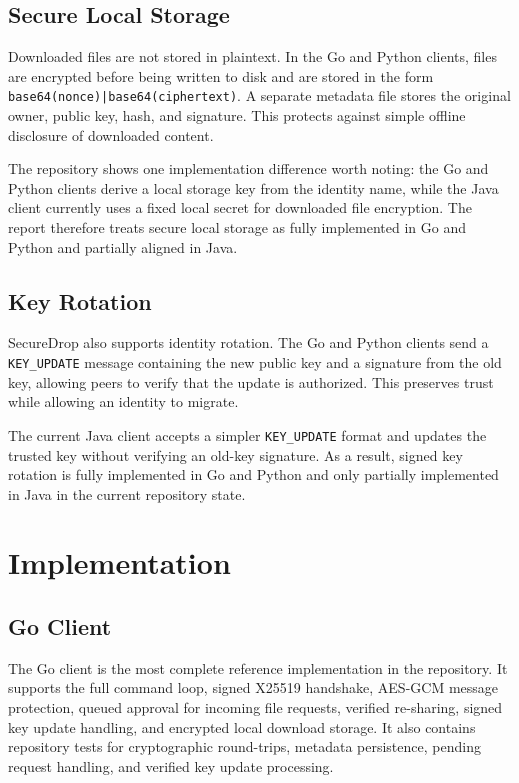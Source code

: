 \documentclass[sigconf,nonacm]{acmart}
\begin{document}
\subsection{Secure Local Storage}
Downloaded files are not stored in plaintext. In the Go and Python
clients, files are encrypted before being written to disk and are stored
in the form \texttt{base64(nonce)|base64(ciphertext)}. A separate metadata
file stores the original owner, public key, hash, and signature. This
protects against simple offline disclosure of downloaded content.

The repository shows one implementation difference worth noting: the Go
and Python clients derive a local storage key from the identity name,
while the Java client currently uses a fixed local secret for downloaded
file encryption. The report therefore treats secure local storage as fully
implemented in Go and Python and partially aligned in Java.

\subsection{Key Rotation}
SecureDrop also supports identity rotation. The Go and Python clients send
a \texttt{KEY\_UPDATE} message containing the new public key and a
signature from the old key, allowing peers to verify that the update is
authorized. This preserves trust while allowing an identity to migrate.

The current Java client accepts a simpler \texttt{KEY\_UPDATE} format and
updates the trusted key without verifying an old-key signature. As a
result, signed key rotation is fully implemented in Go and Python and only
partially implemented in Java in the current repository state.

\section{Implementation}
\subsection{Go Client}
The Go client is the most complete reference implementation in the
repository. It supports the full command loop, signed X25519 handshake,
AES-GCM message protection, queued approval for incoming file requests,
verified re-sharing, signed key update handling, and encrypted local
download storage. It also contains repository tests for cryptographic
round-trips, metadata persistence, pending request handling, and verified
key update processing.
\end{document}
